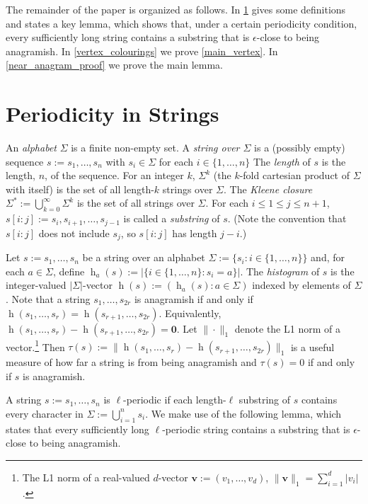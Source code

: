 \documentclass{patmorin}
\DeclareMathOperator{\hist}{h}
\begin{document}

The remainder of the paper is organized as follows.  In \cref{near_anagram_statement} gives some definitions and states a key lemma, which shows that, under a certain periodicity condition, every sufficiently long string contains a substring that is $\epsilon$-close to being anagramish.
In \cref{vertex_colourings} we prove \cref{main_vertex}.  In \cref{near_anagram_proof} we prove the main lemma.

\section{Periodicity in Strings}
\label{near_anagram_statement}

An \emph{alphabet} $\Sigma$ is a finite non-empty set.  A \emph{string over $\Sigma$} is a (possibly empty) sequence $s:=s_1,\ldots,s_n$ with $s_i\in\Sigma$ for each $i\in\{1,\ldots,n\}$ The \emph{length} of $s$ is the length, $n$, of the sequence. For an integer $k$, $\Sigma^k$ (the $k$-fold cartesian product of $\Sigma$ with itself) is the set of all length-$k$ strings over $\Sigma$.  The \emph{Kleene closure} $\Sigma^*:=\bigcup_{k=0}^\infty \Sigma^k$ is the set of all strings over $\Sigma$.  For each $i\le 1\le j\le n+1$, $s[i\mathbin{:}j]:=s_i,s_{i+1},\ldots,s_{j-1}$ is called a \emph{substring} of $s$. (Note the convention that $s[i\mathbin{:}j]$ does not include $s_j$, so $s[i\mathbin{:}j]$ has length $j-i$.)

Let $s:=s_1,\ldots,s_n$ be a string over an alphabet $\Sigma:=\{s_i:i\in\{1,\ldots,n\}\}$ and, for each $a\in \Sigma$, define $\hist_a(s):=|\{i\in\{1,\ldots,n\}:s_i=a\}|$.  The \emph{histogram} of $s$ is the integer-valued $|\Sigma|$-vector $\hist(s):=(\hist_a(s):a\in\Sigma)$ indexed by elements of $\Sigma$.  Note that a string $s_1,\ldots,s_{2r}$ is anagramish if and only if $\hist(s_1,\ldots,s_r)=\hist(s_{r+1},\ldots,s_{2r})$.  Equivalently, $\hist(s_1,\ldots,s_r)-\hist(s_{r+1},\ldots,s_{2r})=\boldsymbol{0}$. Let $\|\cdot\|_1$ denote the L1 norm of a vector.\footnote{The L1 norm of a real-valued $d$-vector $\boldsymbol{v}:=(v_1,\ldots,v_d)$, $\|\boldsymbol{v}\|_1=\sum_{i=1}^d|v_i|$.}
Then $\tau(s):=\|\hist(s_1,\ldots,s_r)-\hist(s_{r+1},\ldots,s_{2r})\|_1$ is a useful measure of how far a string is from being anagramish and $\tau(s)=0$ if and only if $s$ is anagramish.

A string $s:=s_1,\ldots,s_n$ is $\ell$-periodic if each length-$\ell$ substring of $s$ contains every character in $\Sigma:=\bigcup_{i=1}^n s_i$.  We make use of the following lemma, which states that every sufficiently long $\ell$-periodic string contains a substring that is $\epsilon$-close to being anagramish.
\end{document}
